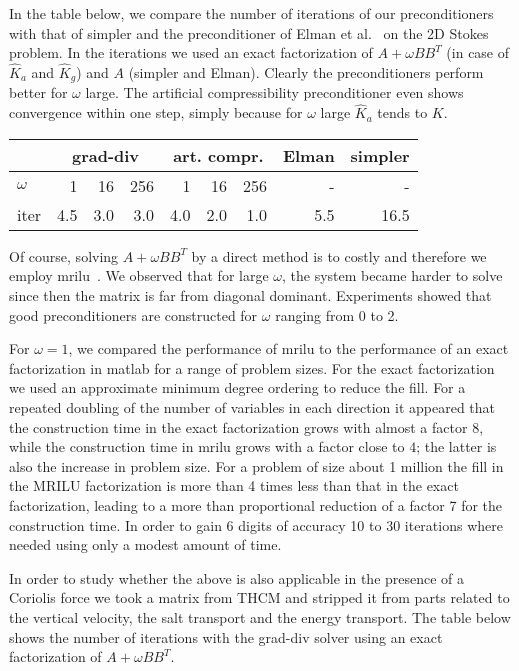 \documentclass{report}
\begin{document}
In the table below, we compare the number of iterations of our
preconditioners with that of {\sc simpler} \cite{vuik02} and the preconditioner
of Elman et al.~\cite{elman2002} on the 2D Stokes problem. In the iterations we used an
exact factorization of $A+\omega BB^T$ (in case of $\hat K_a$ and $\hat K_g$)
and $A$ ({\sc simpler} and Elman). Clearly the preconditioners perform better
for $\omega$ large. The artificial compressibility preconditioner even shows
convergence within one step, simply because for $\omega$ large $\hat K_a$ tends
to $K$.
\begin{center}
\begin{tabular}{l|rrr|rrr|r|r|}
&\multicolumn{3}{|c|}{\sc grad-div} &\multicolumn{3}{|c|}{\sc art.
compr.} &\sc Elman & \sc simpler\\
\hline
$\omega$ & 1 & 16 & 256 & 1 & 16 & 256 & - & - \\
\sc iter& 4.5 & 3.0 & 3.0& 4.0 & 2.0 & 1.0 & 5.5& 16.5 \\
\hline
\end{tabular}
\end{center}

Of course, solving $A+\omega BB^T$ by a direct method is to
costly and therefore we employ {\sc mrilu}~\cite{botta99}. We
observed that for large $\omega$, the system became harder to
solve since then the matrix is far from diagonal dominant.
Experiments showed that good preconditioners are constructed for
$\omega$ ranging from 0 to 2.

For $\omega=1$, we compared the performance of {\sc mrilu} to the
performance of an exact factorization in {\sc matlab} for a range
of problem sizes. For the exact factorization we used an
approximate minimum degree ordering to reduce the fill. For a
repeated doubling of the number of variables in each direction it
appeared that the construction time in the exact factorization
grows with almost a factor $8$, while the construction time in
{\sc mrilu} grows with a factor close to $4$; the latter is also
the increase in problem size. For a problem of size about 1
million the fill in the {\sc MRILU} factorization is more than 4
times less than that in the exact factorization, leading to a more
than proportional reduction of a factor 7 for the construction
time. In order to gain 6 digits of accuracy 10 to 30 iterations
where needed using only a modest amount of time.

In order to study whether the above is also applicable in the presence of a
Coriolis force we took a matrix from THCM and stripped it from parts related to
the vertical velocity, the salt transport and the energy
transport. The table below shows the number of iterations with the
grad-div solver using an exact factorization of $A+\omega BB^T$.
\end{document}
